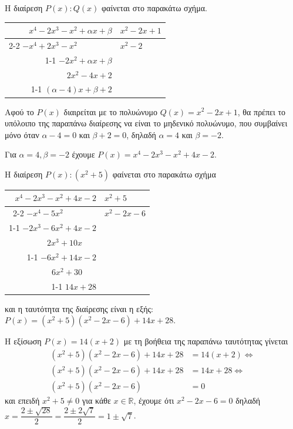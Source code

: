 \begin{alist}
\item Η διαίρεση $P(x) : Q(x)$ φαίνεται στο παρακάτω σχήμα.
\begin{center}
\begin{tabular}{r|l}
$x^4 - 2x^3 - x^2 + \alpha x + \beta$ & $x^2 - 2x + 1$ \\ \cline{2-2}
$-x^4 + 2x^3 - x^2 \phantom{{} + \alpha x + \beta}$ & $x^2 - 2$ \\ \cline{1-1}
$-2x^2 + \alpha x + \beta$ & \\
$2x^2 - 4x + 2$ & \\ \cline{1-1}
$(\alpha - 4)x + \beta + 2$ &
\end{tabular}
\end{center}
Αφού το $P(x)$ διαιρείται με το πολυώνυμο $Q(x) = x^2 - 2x + 1$, θα πρέπει το υπόλοιπο της παραπάνω διαίρεσης να είναι το μηδενικό πολυώνυμο, που συμβαίνει μόνο όταν $\alpha - 4 = 0$ και $\beta + 2 = 0$, δηλαδή $\alpha = 4$ και $\beta = -2$.
\item Για $\alpha = 4, \beta = -2$ έχουμε $P(x) = x^4 - 2x^3 - x^2 + 4x - 2$.
\begin{rlist}
\item Η διαίρεση $P(x) : (x^2 + 5)$ φαίνεται στο παρακάτω σχήμα
\begin{center}
\begin{tabular}{r|l}
$x^4 - 2x^3 - x^2 + 4x - 2$ & $x^2 + 5$ \\ \cline{2-2}
$-x^4 - 5x^2 \phantom{{} + 4x - 2}$ & $x^2 - 2x - 6$ \\ \cline{1-1}
$-2x^3 - 6x^2 + 4x - 2$ & \\
$2x^3 + 10x \phantom{{} - 2}$ & \\ \cline{1-1}
$-6x^2 + 14x - 2$ & \\
$6x^2 + 30 \phantom{{} - 2}$ & \\ \cline{1-1}
$14x + 28$ &
\end{tabular}
\end{center}
και η ταυτότητα της διαίρεσης είναι η εξής: $P(x) = (x^2 + 5)(x^2 - 2x - 6) + 14x + 28$.
\item Η εξίσωση $P(x) = 14(x + 2)$ με τη βοήθεια της παραπάνω ταυτότητας γίνεται
\begin{align*}
(x^2 + 5)(x^2 - 2x - 6) + 14x + 28 &= 14(x + 2) \Leftrightarrow \\
(x^2 + 5)(x^2 - 2x - 6) + 14x + 28 &= 14x + 28 \Leftrightarrow \\
(x^2 + 5)(x^2 - 2x - 6) &= 0
\end{align*}
και επειδή $x^2 + 5 \ne 0$ για κάθε $x \in \mathbb{R}$, έχουμε ότι $x^2 - 2x - 6 = 0$ δηλαδή $x = \dfrac{2 \pm \sqrt{28}}{2} = \dfrac{2 \pm 2\sqrt{7}}{2} = 1 \pm \sqrt{7}$.
\end{rlist}
\end{alist}

